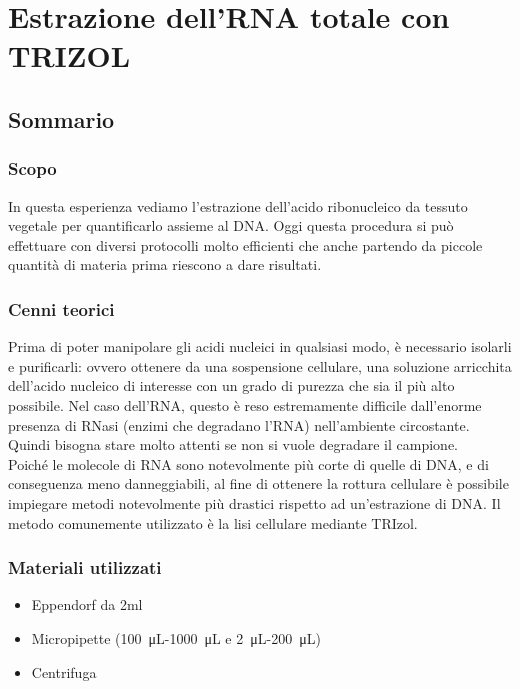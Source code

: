\chapter{Estrazione dell’RNA totale con TRIZOL}

\vspace{0.6cm}


\section{Sommario}


\subsection{Scopo}
In questa esperienza vediamo l’estrazione dell’acido ribonucleico da tessuto
vegetale per quantificarlo assieme al DNA. Oggi questa procedura si pu\`o effettuare
con diversi protocolli molto efficienti che anche partendo da piccole quantit\`a
di materia prima riescono a dare risultati.

\subsection{Cenni teorici}
Prima di poter manipolare gli acidi nucleici in qualsiasi modo, è necessario
isolarli e purificarli: ovvero ottenere da una sospensione cellulare,
una soluzione arricchita dell’acido nucleico di interesse con un grado di purezza
che sia il più alto possibile. Nel caso dell’RNA, questo è reso estremamente
difficile dall’enorme presenza di RNasi (enzimi che degradano l’RNA) nell’ambiente circostante.
Quindi bisogna stare molto attenti se non si vuole degradare il campione. \\
Poiché le molecole di RNA sono notevolmente più corte di quelle di DNA, e di conseguenza
meno danneggiabili, al fine di ottenere la rottura cellulare è possibile
impiegare metodi notevolmente più drastici rispetto ad un’estrazione di DNA.
Il metodo comunemente utilizzato è la lisi cellulare mediante TRIzol.

\subsection{Materiali utilizzati}

\begin{itemize}
\item Eppendorf da 2ml
\item Micropipette (\SI{100}{\micro\liter}-\SI{1000}{\micro\liter} e \SI{2}{\micro\liter}-\SI{200}{\micro\liter})
\item Centrifuga
\end{itemize}

